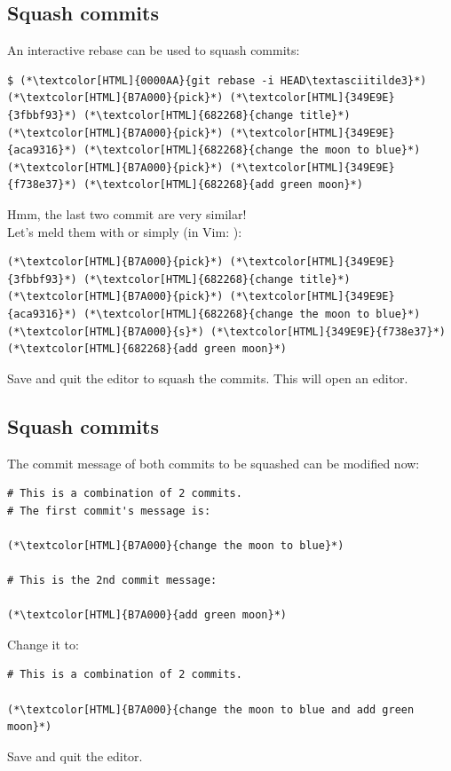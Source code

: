 \subsection{Squash commits}
\begin{frame}[fragile]
  \subslidetitle
  An interactive rebase can be used to squash commits:
  \begin{lstlisting}
$ (*\textcolor[HTML]{0000AA}{git rebase -i HEAD\textasciitilde3}*)
(*\textcolor[HTML]{B7A000}{pick}*) (*\textcolor[HTML]{349E9E}{3fbbf93}*) (*\textcolor[HTML]{682268}{change title}*)
(*\textcolor[HTML]{B7A000}{pick}*) (*\textcolor[HTML]{349E9E}{aca9316}*) (*\textcolor[HTML]{682268}{change the moon to blue}*)
(*\textcolor[HTML]{B7A000}{pick}*) (*\textcolor[HTML]{349E9E}{f738e37}*) (*\textcolor[HTML]{682268}{add green moon}*)
\end{lstlisting}
  Hmm, the last two commit are very similar!\\

  \vspace{1em}
  Let's meld them with  or simply  (in Vim: ):
  \begin{lstlisting}
(*\textcolor[HTML]{B7A000}{pick}*) (*\textcolor[HTML]{349E9E}{3fbbf93}*) (*\textcolor[HTML]{682268}{change title}*)
(*\textcolor[HTML]{B7A000}{pick}*) (*\textcolor[HTML]{349E9E}{aca9316}*) (*\textcolor[HTML]{682268}{change the moon to blue}*)
(*\textcolor[HTML]{B7A000}{s}*) (*\textcolor[HTML]{349E9E}{f738e37}*) (*\textcolor[HTML]{682268}{add green moon}*)
\end{lstlisting}
  Save and quit the editor to squash the commits. This will open an editor.
\end{frame}

\subsection{Squash commits}
\begin{frame}[fragile]
  \subslidetitle
  The commit message of both commits to be squashed can be modified now:
  \begin{lstlisting}
# This is a combination of 2 commits.
# The first commit's message is:

(*\textcolor[HTML]{B7A000}{change the moon to blue}*)

# This is the 2nd commit message:

(*\textcolor[HTML]{B7A000}{add green moon}*)
\end{lstlisting}

  Change it to:
  \begin{lstlisting}
# This is a combination of 2 commits.

(*\textcolor[HTML]{B7A000}{change the moon to blue and add green moon}*)

\end{lstlisting}
  Save and quit the editor.
\end{frame}

